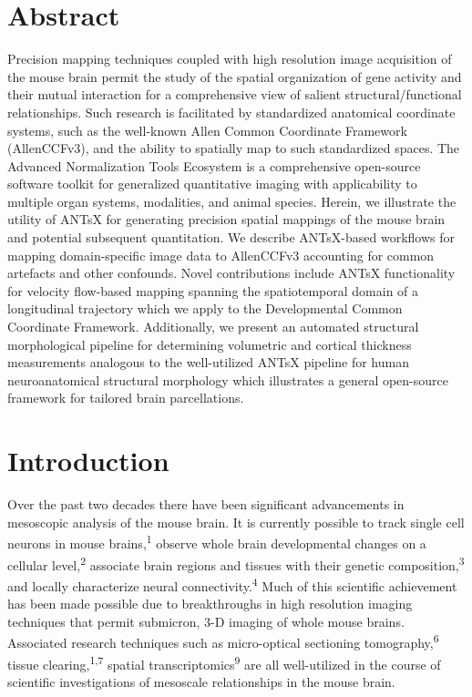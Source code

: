 \documentclass[
  12pt,
]{article}
\begin{document}
\normalsize

\newpage


\hypertarget{abstract}{%
\section*{Abstract}\label{abstract}}

Precision mapping techniques coupled with high resolution image
acquisition of the mouse brain permit the study of the spatial
organization of gene activity and their mutual interaction for a
comprehensive view of salient structural/functional relationships. Such
research is facilitated by standardized anatomical coordinate systems,
such as the well-known Allen Common Coordinate Framework (AllenCCFv3),
and the ability to spatially map to such standardized spaces. The
Advanced Normalization Tools Ecosystem is a comprehensive open-source
software toolkit for generalized quantitative imaging with applicability
to multiple organ systems, modalities, and animal species. Herein, we
illustrate the utility of ANTsX for generating precision spatial
mappings of the mouse brain and potential subsequent quantitation. We
describe ANTsX-based workflows for mapping domain-specific image data to
AllenCCFv3 accounting for common artefacts and other confounds. Novel
contributions include ANTsX functionality for velocity flow-based
mapping spanning the spatiotemporal domain of a longitudinal trajectory
which we apply to the Developmental Common Coordinate Framework.
Additionally, we present an automated structural morphological pipeline
for determining volumetric and cortical thickness measurements analogous
to the well-utilized ANTsX pipeline for human neuroanatomical structural
morphology which illustrates a general open-source framework for
tailored brain parcellations.

\clearpage

\hypertarget{introduction}{%
\section{Introduction}\label{introduction}}

Over the past two decades there have been significant advancements in
mesoscopic analysis of the mouse brain. It is currently possible to
track single cell neurons in mouse brains,\textsuperscript{1} observe
whole brain developmental changes on a cellular
level,\textsuperscript{2} associate brain regions and tissues with their
genetic composition,\textsuperscript{3} and locally characterize neural
connectivity.\textsuperscript{4} Much of this scientific achievement has
been made possible due to breakthroughs in high resolution imaging
techniques that permit submicron, 3-D imaging of whole mouse brains.
Associated research techniques such as micro-optical sectioning
tomography,\textsuperscript{6} tissue clearing,\textsuperscript{1,7}
spatial transcriptomics\textsuperscript{9} are all well-utilized in the
course of scientific investigations of mesoscale relationships in the
mouse brain.
\end{document}
